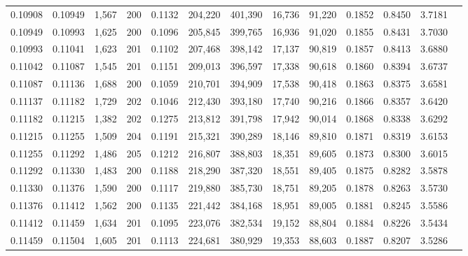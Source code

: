 \begin{tabular}{rrrrrrrrrrrrr}
0.10908 & 0.10949 & 1,567 & 200 &                                     0.1132 & 204,220 & 401,390 &  16,736 &  91,220 & 0.1852 & 0.8450 & 3.7181 \\
0.10949 & 0.10993 & 1,625 & 200 &                                     0.1096 & 205,845 & 399,765 &  16,936 &  91,020 & 0.1855 & 0.8431 & 3.7030 \\
0.10993 & 0.11041 & 1,623 & 201 &                                     0.1102 & 207,468 & 398,142 &  17,137 &  90,819 & 0.1857 & 0.8413 & 3.6880 \\
0.11042 & 0.11087 & 1,545 & 201 &                                     0.1151 & 209,013 & 396,597 &  17,338 &  90,618 & 0.1860 & 0.8394 & 3.6737 \\
0.11087 & 0.11136 & 1,688 & 200 &                                     0.1059 & 210,701 & 394,909 &  17,538 &  90,418 & 0.1863 & 0.8375 & 3.6581 \\
0.11137 & 0.11182 & 1,729 & 202 &                                     0.1046 & 212,430 & 393,180 &  17,740 &  90,216 & 0.1866 & 0.8357 & 3.6420 \\
0.11182 & 0.11215 & 1,382 & 202 &                                     0.1275 & 213,812 & 391,798 &  17,942 &  90,014 & 0.1868 & 0.8338 & 3.6292 \\
0.11215 & 0.11255 & 1,509 & 204 &                                     0.1191 & 215,321 & 390,289 &  18,146 &  89,810 & 0.1871 & 0.8319 & 3.6153 \\
0.11255 & 0.11292 & 1,486 & 205 &                                     0.1212 & 216,807 & 388,803 &  18,351 &  89,605 & 0.1873 & 0.8300 & 3.6015 \\
0.11292 & 0.11330 & 1,483 & 200 &                                     0.1188 & 218,290 & 387,320 &  18,551 &  89,405 & 0.1875 & 0.8282 & 3.5878 \\
0.11330 & 0.11376 & 1,590 & 200 &                                     0.1117 & 219,880 & 385,730 &  18,751 &  89,205 & 0.1878 & 0.8263 & 3.5730 \\
0.11376 & 0.11412 & 1,562 & 200 &                                     0.1135 & 221,442 & 384,168 &  18,951 &  89,005 & 0.1881 & 0.8245 & 3.5586 \\
0.11412 & 0.11459 & 1,634 & 201 &                                     0.1095 & 223,076 & 382,534 &  19,152 &  88,804 & 0.1884 & 0.8226 & 3.5434 \\
0.11459 & 0.11504 & 1,605 & 201 &                                     0.1113 & 224,681 & 380,929 &  19,353 &  88,603 & 0.1887 & 0.8207 & 3.5286 \\

\end{tabular}
